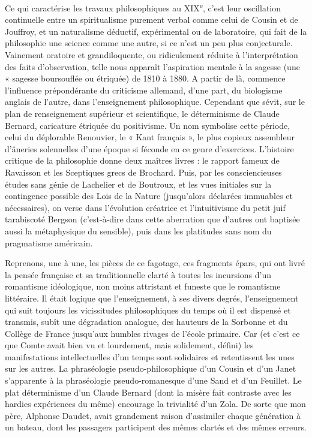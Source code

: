 \documentclass[french,twoside]{book} %
\begin{document}
Ce qui caractérise les travaux philosophiques au XIX\textsuperscript{e}, c’est leur oscillation continuelle entre un spiritualisme purement verbal comme celui de Cousin et de Jouffroy, et un naturalisme déductif, expérimental ou de laboratoire, qui fait de la philosophie une science comme une autre, si ce n’est un peu plus conjecturale. Vainement oratoire et grandiloquente, ou ridiculement réduite à l’interprétation des faits d’observation, telle nous apparaît l’aspiration mentale à la sagesse (une « sagesse boursouflée ou étriquée) de 1810 à 1880. A partir de là, commence l’influence prépondérante du criticisme allemand, d’une part, du biologisme anglais de l’autre, dans l’enseignement philosophique. Cependant que sévit, sur le plan de renseignement supérieur et scientifique, le déterminisme de Claude Bernard, caricature étriquée du positivisme. Un nom symbolise cette période, celui du déplorable Renouvier, le « Kant français », le plus copieux assembleur d’âneries solennelles d’une époque si féconde en ce genre d’exercices. L’histoire critique de la philosophie donne deux maîtres livres : le rapport fameux de Ravaisson et les Sceptiques grecs de Brochard. Puis, par les consciencieuses études sans génie de Lachelier et de Boutroux, et les vues initiales sur la contingence possible des Lois de la Nature (jusqu’alors déclarées immuables et nécessaires), on verse dans l’évolution créatrice et l’intuitivisme du petit juif tarabiscoté Bergson (c’est-à-dire dans cette aberration que d’autres ont baptisée aussi la métaphysique du sensible), puis dans les platitudes sans nom du pragmatisme américain.\par
Reprenons, une à une, les pièces de ce fagotage, ces fragments épars, qui ont livré la pensée française et sa traditionnelle clarté à toutes les incursions d’un romantisme idéologique, non moins attristant et funeste que le romantisme littéraire. Il était logique que l’enseignement, à ses divers degrés, l’enseignement qui suit toujours les vicissitudes philosophiques du temps où il est dispensé et transmis, subît une dégradation analogue, des hauteurs de la Sorbonne et du Collège de France jusqu’aux humbles rivages de l’école primaire. Car (et c’est ce que Comte avait bien vu et lourdement, mais solidement, défini) les manifestations intellectuelles d’un temps sont solidaires et retentissent les unes sur les autres. La phraséologie pseudo-philosophique d’un Cousin et d’un Janet s’apparente à la phraséologie pseudo-romanesque d’une Sand et d’un Feuillet. Le plat déterminisme d’un Claude Bernard (dont la misère fait contraste avec les hardies expériences du même) encourage la trivialité d’un Zola. De sorte que mon père, Alphonse Daudet, avait grandement raison d’assimiler chaque génération à un bateau, dont les passagers participent des mêmes clartés et des mêmes erreurs.\par
\end{document}
